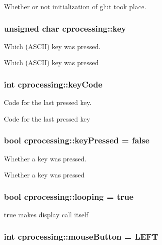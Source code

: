 \-Whether or not initialization of glut took place. 

\hypertarget{namespacecprocessing_a8943a4676a0d064d844b15fc85d5893c}{
\subsubsection[{key}]{\setlength{\rightskip}{0pt plus 5cm}unsigned char {\bf cprocessing\-::key}}}\label{namespacecprocessing_a8943a4676a0d064d844b15fc85d5893c}


\-Which (\-A\-S\-C\-I\-I) key was pressed. 

\-Which (\-A\-S\-C\-I\-I) key was pressed \hypertarget{namespacecprocessing_acbef3b8ea033c7882b342ca95663df13}{
\subsubsection[{key\-Code}]{\setlength{\rightskip}{0pt plus 5cm}int {\bf cprocessing\-::key\-Code}}}\label{namespacecprocessing_acbef3b8ea033c7882b342ca95663df13}


\-Code for the last pressed key. 

\-Code for the last pressed key \hypertarget{namespacecprocessing_afc97118ddb342c47a4b70c6965dfee09}{
\subsubsection[{key\-Pressed}]{\setlength{\rightskip}{0pt plus 5cm}bool {\bf cprocessing\-::key\-Pressed} = false}}\label{namespacecprocessing_afc97118ddb342c47a4b70c6965dfee09}


\-Whether a key was pressed. 

\-Whether a key was pressed \hypertarget{namespacecprocessing_adb31b652ffe4e5d37d118050f97e9c3c}{
\subsubsection[{looping}]{\setlength{\rightskip}{0pt plus 5cm}bool {\bf cprocessing\-::looping} = true}}\label{namespacecprocessing_adb31b652ffe4e5d37d118050f97e9c3c}
true makes display call itself \hypertarget{namespacecprocessing_ac291906023e7749b6351265a5a5f589e}{
\subsubsection[{mouse\-Button}]{\setlength{\rightskip}{0pt plus 5cm}int {\bf cprocessing\-::mouse\-Button} = {\bf \-L\-E\-F\-T}}}\label{namespacecprocessing_ac291906023e7749b6351265a5a5f589e}


